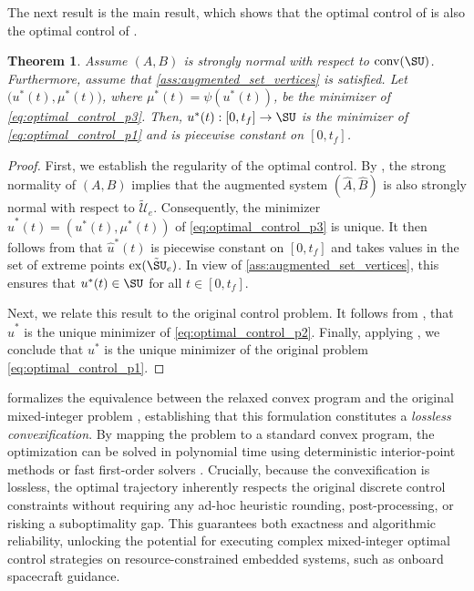 \documentclass[conf]{new-aiaa}
\newtheorem{theorem}{Theorem}
\begin{document}
The next result is the main result, which shows that the optimal control of  is also the optimal control of .

\begin{theorem}\label{thm:CP_for_MICP}
Assume $(A, B)$ is strongly normal with respect to $\mathrm{conv}(\SU)$. Furthermore, assume that \ref{ass:augmented_set_vertices} is satisfied. Let $\big(u^*(t),\mu^*(t)\big)$, where $\mu^*(t)=\psi(u^*(t))$, be the minimizer of \cref{eq:optimal_control_p3}. Then, $u^*(t):[0,t_f]\to \SU$ is the minimizer of \cref{eq:optimal_control_p1} and is piecewise constant on $[0,t_f]$.
\end{theorem}

\begin{proof}
First, we establish the regularity of the optimal control. By , the strong normality of $(A, B)$ implies that the augmented system $(\hat{A}, \hat{B})$ is also strongly normal with respect to $\tilde{\mathcal{U}}_e$. Consequently, the minimizer $\hat{u}^*(t) = (u^*(t), \mu^*(t))$ of \cref{eq:optimal_control_p3} is unique. It then follows from  that $\hat{u}^*(t)$ is piecewise constant on $[0,t_f]$ and takes values in the set of extreme points $\mathrm{ex}(\tilde{\SU}_e)$. In view of \ref{ass:augmented_set_vertices}, this ensures that $u^*(t) \in \SU$ for all $t \in [0, t_f]$.

Next, we relate this result to the original control problem. It follows from \cite[Theorem 1]{harris_optimal_2021}, that $\hat{u}^*$ is the unique minimizer of \cref{eq:optimal_control_p2}. Finally, applying , we conclude that $u^*$ is the unique minimizer of the original problem \cref{eq:optimal_control_p1}.
\end{proof}

 formalizes the equivalence between the relaxed convex program  and the original mixed-integer problem , establishing that this formulation constitutes a \textit{lossless convexification}. By mapping the problem to a standard convex program, the optimization can be solved in polynomial time using deterministic interior-point methods or fast first-order solvers \cite{boyd_convex_2023}. Crucially, because the convexification is lossless, the optimal trajectory inherently respects the original discrete control constraints without requiring any ad-hoc heuristic rounding, post-processing, or risking a suboptimality gap. This guarantees both exactness and algorithmic reliability, unlocking the potential for executing complex mixed-integer optimal control strategies on resource-constrained embedded systems, such as onboard spacecraft guidance.
\end{document}
